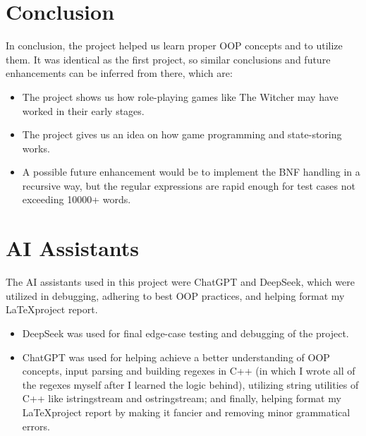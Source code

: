 \documentclass[a4paper,12pt]{article}
\begin{document}
\section{Conclusion}
In conclusion, the project helped us learn proper OOP concepts and to utilize them. It was identical as the first project, so similar conclusions and future enhancements can be inferred from there, which are: \begin{itemize}
    \item The project shows us how role-playing games like The Witcher may have worked in their early stages.
    \item The project gives us an idea on how game programming and state-storing works.
    \item A possible future enhancement would be to implement the BNF handling in a recursive way, but the regular expressions are rapid enough for test cases not exceeding 10000+ words.
\end{itemize}




\nocite{*}

\section*{AI Assistants}
The AI assistants used in this project were ChatGPT and DeepSeek, which were utilized in debugging, adhering to best OOP practices, and helping format my \LaTeX project report.\\
\begin{itemize}
    \item DeepSeek was used for final edge-case testing and debugging of the project.
    \item ChatGPT was used for helping achieve a better understanding of OOP concepts, input parsing and building regexes in C++ (in which I wrote all of the regexes myself after I learned the logic behind), utilizing string utilities of C++ like istringstream and ostringstream; and finally, helping format my \LaTeX project report by making it fancier and removing minor grammatical errors.
\end{itemize}
\end{document}
